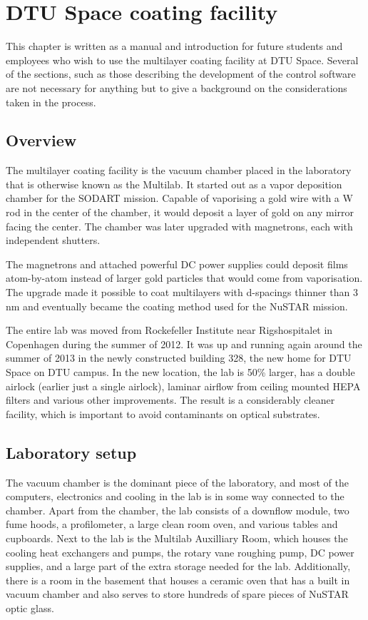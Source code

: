 \chapter{DTU Space coating facility}
This chapter is written as a manual and introduction for future students and employees who wish to use the multilayer coating facility at DTU Space. Several of the sections, such as those describing the development of the control software are not necessary for anything but to give a background on the considerations taken in the process.

\section{Overview}
The multilayer coating facility is the vacuum chamber placed in the laboratory that is otherwise known as the Multilab. It started out as a vapor deposition chamber for the SODART mission. Capable of vaporising a gold wire with a W rod in the center of the chamber, it would deposit a layer of gold on any mirror facing the center. The chamber was later upgraded with magnetrons, each with independent shutters.

The magnetrons and attached powerful DC power supplies could deposit films atom-by-atom instead of larger gold particles that would come from vaporisation. The upgrade made it possible to coat multilayers with d-spacings thinner than 3 nm and eventually became the coating method used for the NuSTAR mission.

The entire lab was moved from Rockefeller Institute near Rigshospitalet in Copenhagen during the summer of 2012. It was up and running again around the summer of 2013 in the newly constructed building 328, the new home for DTU Space on DTU campus. In the new location, the lab is 50\% larger, has a double airlock (earlier just a single airlock), laminar airflow from ceiling mounted HEPA filters and various other improvements. The result is a considerably cleaner facility, which is important to avoid contaminants on optical substrates.

\section{Laboratory setup}
The vacuum chamber is the dominant piece of the laboratory, and most of the computers, electronics and cooling in the lab is in some way connected to the chamber. Apart from the chamber, the lab consists of a downflow module, two fume hoods, a profilometer, a large clean room oven, and various tables and cupboards. Next to the lab is the Multilab Auxilliary Room, which houses the cooling heat exchangers and pumps, the rotary vane roughing pump, DC power supplies, and a large part of the extra storage needed for the lab. Additionally, there is a room in the basement that houses a ceramic oven that has a built in vacuum chamber and also serves to store hundreds of spare pieces of NuSTAR optic glass.

